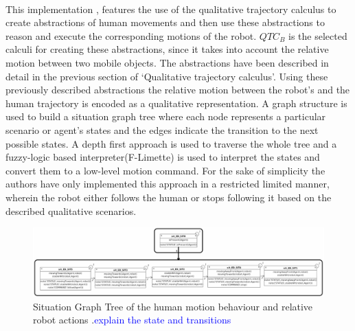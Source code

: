 	 \paragraph{}This implementation \cite{bellotto2012robot}, features the use of the qualitative trajectory calculus to create abstractions of human movements and then use these abstractions to reason and execute the corresponding motions of the robot. $QTC_B$ is the selected calculi for creating these abstractions, since it takes into account the relative motion between two mobile objects. The abstractions have been described in detail in the previous section of `Qualitative trajectory calculus'. Using these previously described abstractions the relative motion between the robot's and the human trajectory is encoded as a qualitative representation. A graph structure is used to build a situation graph tree where each node represents a particular scenario or agent's states and the edges indicate the transition to the next possible states. A depth first approach is used to traverse the whole tree and a fuzzy-logic based interpreter(F-Limette) is used to  interpret the states and convert them to a low-level motion command. For the sake of simplicity the authors have only implemented this approach in a restricted limited manner, wherein the robot either follows the human or stops following it based on the described qualitative scenarios.
	\begin{figure}[h]
		\centering
		\includegraphics[scale = 0.6]{images/graph}
		\caption{Situation Graph Tree of the human motion behaviour and relative robot actions \cite{bellotto2012robot}.\textcolor{blue}{explain the state and transitions}}
		\label{fig:graph}
	\end{figure}
	

